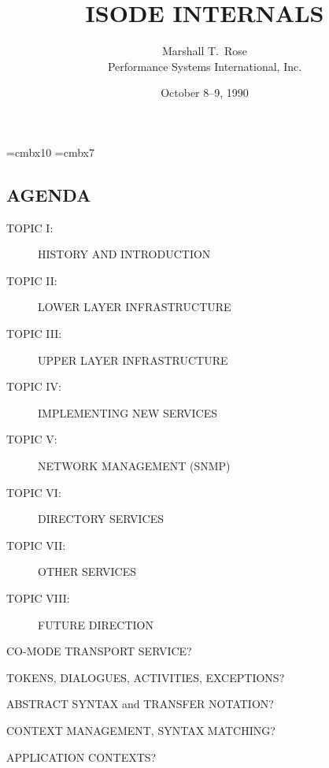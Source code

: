 

\newif\ifpractical

\def\emph#1{\underline{#1}}

\font\xx=cmbx10
\font\yy=cmbx7

\raggedright


\let\tradeNAMfont=\relax
\let\tradeORGfont=\relax





\title	{ISODE INTERNALS}
\author	{Marshall T.~Rose\\ Performance Systems International, Inc.}
\date	{October 8--9, 1990}
\maketitlepage


\begin{bwslide}\thispagestyle{empty}
\part*	{AGENDA}\bf

\begin{description}
\item[TOPIC I:]		HISTORY AND INTRODUCTION

\item[TOPIC II:]	LOWER LAYER INFRASTRUCTURE

\item[TOPIC III:]	UPPER LAYER INFRASTRUCTURE

\item[TOPIC IV:]	IMPLEMENTING NEW SERVICES

\item[TOPIC V:]		NETWORK MANAGEMENT (SNMP)

\item[TOPIC VI:]	DIRECTORY SERVICES

\item[TOPIC VII:]	OTHER SERVICES

\item[TOPIC VIII:]	FUTURE DIRECTION
\end{description}
\end{bwslide}


\setcounter{slide}{0}
\begin{bwslide}

\begin{nrtc}
\item	CO-MODE TRANSPORT SERVICE?

\item	TOKENS, DIALOGUES, ACTIVITIES, EXCEPTIONS?

\item	ABSTRACT SYNTAX and TRANSFER NOTATION?

\item	CONTEXT MANAGEMENT, SYNTAX MATCHING?

\item	APPLICATION CONTEXTS?
\end{nrtc}
\end{bwslide}



